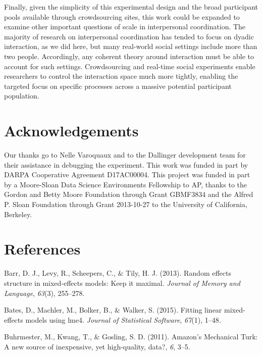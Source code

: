\documentclass[10pt, letterpaper]{article}
\begin{document}
Finally, given the simplicity of this experimental design and the broad
participant pools available through crowdsourcing sites, this work could
be expanded to examine other important questions of scale in
interpersonal coordination. The majority of research on interpersonal
coordination has tended to focus on dyadic interaction, as we did here,
but many real-world social settings include more than two people.
Accordingly, any coherent theory around interaction must be able to
account for such settings. Crowdsourcing and real-time social
experiments enable researchers to control the interaction space much
more tightly, enabling the targeted focus on specific processes across a
massive potential participant population.

\section{Acknowledgements}\label{acknowledgements}

Our thanks go to Nelle Varoquaux and to the Dallinger development team
for their assistance in debugging the experiment. This work was funded
in part by DARPA Cooperative Agreement D17AC00004. This project was
funded in part by a Moore-Sloan Data Science Environments Fellowship to
AP, thanks to the Gordon and Betty Moore Foundation through Grant
GBMF3834 and the Alfred P. Sloan Foundation through Grant 2013-10-27 to
the University of California, Berkeley.

\section{References}\label{references}

\setlength{\parindent}{-0.1in} \setlength{\leftskip}{0.125in} \noindent

\hypertarget{refs}{}
\hypertarget{ref-barr2013random}{}
Barr, D. J., Levy, R., Scheepers, C., \& Tily, H. J. (2013). Random
effects structure in mixed-effects models: Keep it maximal.
\emph{Journal of Memory and Language}, \emph{63}(3), 255--278.

\hypertarget{ref-bates2015fitting}{}
Bates, D., Machler, M., Bolker, B., \& Walker, S. (2015). Fitting linear
mixed-effects models using lme4. \emph{Journal of Statistical Software},
\emph{67}(1), 1--48.

\hypertarget{ref-buhrmester2011amazon}{}
Buhrmester, M., Kwang, T., \& Gosling, S. D. (2011). Amazon's Mechanical
Turk: A new source of inexpensive, yet high-quality, data?, \emph{6},
3--5.
\end{document}
